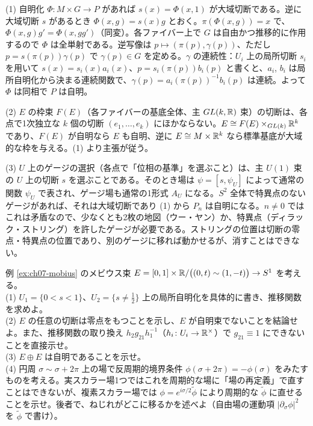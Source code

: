 \begin{solution}
(1) 自明化 $\Phi\colon M\times G\to P$ があれば $s(x)=\Phi(x,1)$ が大域切断である。逆に大域切断 $s$ があるとき $\Phi(x,g)=s(x)g$ とおく。$\pi(\Phi(x,g))=x$ で、$\Phi(x,g)g'=\Phi(x,gg')$（同変）。各ファイバー上で $G$ は自由かつ推移的に作用するので $\Phi$ は全単射である。逆写像は $p\mapsto(\pi(p),\gamma(p))$、ただし $p=s(\pi(p))\gamma(p)$ で $\gamma(p)\in G$ を定める。$\gamma$ の連続性：$U_i$ 上の局所切断 $s_i$ を用いて $s(x)=s_i(x)a_i(x)$、$p=s_i(\pi(p))b_i(p)$ と書くと、$a_i$, $b_i$ は局所自明化から決まる連続関数で、$\gamma(p)=a_i(\pi(p))^{-1}b_i(p)$ は連続。よって $\Phi$ は同相で $P$ は自明。

(2) $E$ の枠束 $F(E)$（各ファイバーの基底全体、主 $GL(k,\mathbb{R})$ 束）の切断は、各点で1次独立な $k$ 個の切断 $(e_1,\dots,e_k)$ にほかならない。$E\cong F(E)\times_{GL(k)}\mathbb{R}^k$ であり、$F(E)$ が自明なら $E$ も自明、逆に $E\cong M\times\mathbb{R}^k$ なら標準基底が大域的な枠を与える。(1) より主張が従う。

(3) $U$ 上のゲージの選択（各点で「位相の基準」を選ぶこと）は、主 $U(1)$ 束の $U$ 上の切断 $s$ を選ぶことである。そのとき場は $\psi=[s,\psi_U]$ によって通常の関数 $\psi_U$ で表され、ゲージ場も通常の1形式 $A_U$ になる。$S^2$ 全体で特異点のないゲージがあれば、それは大域切断であり (1) から $P_n$ は自明になる。$n\neq0$ ではこれは矛盾なので、少なくとも2枚の地図（ウー・ヤン）か、特異点（ディラック・ストリング）を許したゲージが必要である。ストリングの位置は切断の零点・特異点の位置であり、別のゲージに移れば動かせるが、消すことはできない。
\end{solution}

\begin{problem}[難易度 B]\label{ch07-prob-mobius}
例 \ref{ex:ch07-mobius} のメビウス束 $E=[0,1]\times\mathbb{R}/\bigl((0,t)\sim(1,-t)\bigr)\to S^1$ を考える。\\
(1) $U_1=\{0<s<1\}$、$U_2=\{s\neq\tfrac12\}$ 上の局所自明化を具体的に書き、推移関数を求めよ。\\
(2) $E$ の任意の切断は零点をもつことを示し、$E$ が自明束でないことを結論せよ。また、推移関数の取り換え $h_2g_{21}h_1^{-1}$（$h_i\colon U_i\to\mathbb{R}^\times$）で $g_{21}\equiv1$ にできないことを直接示せ。\\
(3) $E\oplus E$ は自明であることを示せ。\\
(4) 円周 $\sigma\sim\sigma+2\pi$ 上の場で反周期的境界条件 $\phi(\sigma+2\pi)=-\phi(\sigma)$ をみたすものを考える。実スカラー場1つではこれを周期的な場に「場の再定義」で直すことはできないが、複素スカラー場では $\phi=e^{i\sigma/2}\tilde\phi$ により周期的な $\tilde\phi$ に直せることを示せ。後者で、ねじれがどこに移るかを述べよ（自由場の運動項 $\lvert\partial_\sigma\phi\rvert^2$ を $\tilde\phi$ で書け）。
\end{problem}

